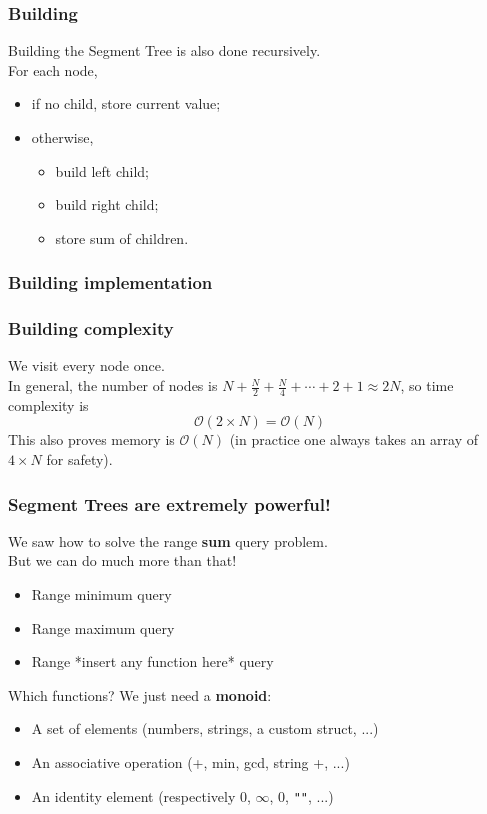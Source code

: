 \documentclass[12pt]{beamer}
\newcommand{\bigoh}{\mathcal{O}}
\begin{document}
\begin{frame}
    \frametitle{Building}
    Building the Segment Tree is also done recursively. \\
    For each node,
    \begin{itemize}
        \item if no child, store current value;
        \item otherwise,
            \begin{itemize}
                \item build left child;
                \item build right child;
                \item store sum of children.
            \end{itemize}
    \end{itemize}
\end{frame}

\begin{frame}
    \frametitle{Building implementation}
    
\end{frame}

\begin{frame}
    \frametitle{Building complexity}
    We visit every node once. \\
    In general, the number of nodes is $ N + \frac{N}{2} + \frac{N}{4} + \cdots + 2 + 1 \approx 2N $, so time complexity is
    \[ \bigoh(2\times N) = \bigoh(N) \]
    This also proves memory is $ \bigoh(N) $ (in practice one always takes an array of $4\times N$ for safety).
\end{frame}

\begin{frame}
    \frametitle{Segment Trees are extremely powerful!}
    We saw how to solve the range \textbf{sum} query problem.\\
    But we can do much more than that! \\
    \begin{itemize}
        \item Range minimum query
        \item Range maximum query
        \item Range *insert any function here* query
    \end{itemize}

    Which functions? We just need a \textbf{monoid}:
    \begin{itemize}
        \item A set of elements (numbers, strings, a custom struct, ...)
        \item An associative operation (+, min, gcd, string +, ...)
        \item An identity element (respectively 0, $\infty$, 0, \lstinline{""}, ...)
    \end{itemize}
\end{frame}
\end{document}
